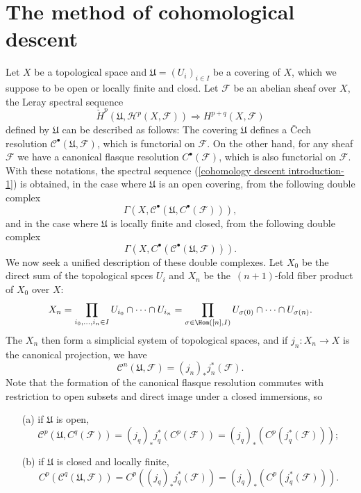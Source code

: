 \section{The method of cohomological descent}
Let $X$ be a topological space and $\mathfrak{U}=(U_i)_{i\in I}$ be a covering of $X$, which we suppose to be open or locally finite and closd. Let $\mathscr{F}$ be an abelian sheaf over $X$, the Leray spectral sequence
\begin{equation}\label{cohomology descent introduction-1}
\check{H}^p(\mathfrak{U},\mathcal{H}^p(X,\mathscr{F}))\Rightarrow H^{p+q}(X,\mathscr{F})
\end{equation}
defined by $\mathfrak{U}$ can be described as follows: The covering $\mathfrak{U}$ defines a \v{C}ech resolution $\mathscr{C}^\bullet(\mathfrak{U},\mathscr{F})$, which is functorial on $\mathscr{F}$. On the other hand, for any sheaf $\mathscr{F}$ we have a canonical flasque resolution $C^\bullet(\mathscr{F})$, which is also functorial on $\mathscr{F}$. With these notations, the spectral sequence (\ref{cohomology descent introduction-1}) is obtained, in the case where $\mathfrak{U}$ is an open covering, from the following double complex
\[\Gamma(X,\mathscr{C}^\bullet(\mathfrak{U},C^\bullet(\mathscr{F}))),\]
and in the case where $\mathfrak{U}$ is locally finite and closed, from the following double complex
\[\Gamma(X,C^\bullet(\mathscr{C}^\bullet(\mathfrak{U},\mathscr{F}))).\]
We now seek a unified description of these double complexes. Let $X_0$ be the direct sum of the topological spces $U_i$ and $X_n$ be the~$(n+1)$-fold fiber product of $X_0$ over $X$:
\begin{equation}\label{cohomology descent introduction-2}
X_n=\prod_{i_0,\dots,i_n\in I}U_{i_0}\cap\cdots\cap U_{i_n}=\prod_{\sigma\in\Hom([n],I)}U_{\sigma(0)}\cap\cdots\cap U_{\sigma(n)}.
\end{equation}
The $X_n$ then form a simplicial system of topological spaces, and if $j_n:X_n\to X$ is the canonical projection, we have 
\begin{equation}\label{cohomology descent introduction-3}
\mathscr{C}^n(\mathfrak{U},\mathscr{F})=(j_n)_*j_n^*(\mathscr{F}).
\end{equation}
Note that the formation of the canonical flasque resolution commutes with restriction to open subsets and direct image under a closed immersions, so
\begin{enumerate}
\item[(a)] if $\mathfrak{U}$ is open, 
\[\mathscr{C}^p(\mathfrak{U},C^q(\mathscr{F}))=(j_q)_*j_q^*(C^p(\mathscr{F}))=(j_q)_*(C^p(j_q^*(\mathscr{F})));\]
\item[(b)] if $\mathfrak{U}$ is closed and locally finite,
\[C^p(\mathscr{C}^q(\mathfrak{U},\mathscr{F}))=C^p((j_q)_*j_q^*(\mathscr{F}))=(j_q)_*(C^p(j_q^*(\mathscr{F}))).\]
\end{enumerate}
